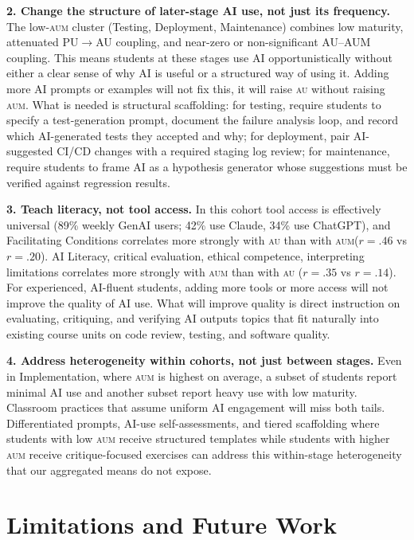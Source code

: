 \documentclass[sigconf,anonymous]{acmart}
\newcommand{\AUM}{\textsc{aum}\xspace}
\newcommand{\AU}{\textsc{au}\xspace}
\newcommand{\GenAI}{GenAI\xspace}
\begin{document}
\textbf{2. Change the structure of later-stage AI use, not just its
frequency.} The low-\AUM cluster (Testing, Deployment, Maintenance)
combines low maturity, attenuated PU$\rightarrow$AU coupling, and
near-zero or non-significant AU--AUM coupling. This means students at
these stages use AI opportunistically without either a clear sense of
why AI is useful or a structured way of using it. Adding more AI
prompts or examples will not fix this, it will raise \AU without
raising \AUM. What is needed is structural scaffolding: for testing,
require students to specify a test-generation prompt, document the
failure analysis loop, and record which AI-generated tests they
accepted and why; for deployment, pair AI-suggested CI/CD changes with
a required staging log review; for maintenance, require students to
frame AI as a hypothesis generator whose suggestions must be verified
against regression results.

\textbf{3. Teach literacy, not tool access.} In this cohort tool
access is effectively universal (89\% weekly \GenAI users; 42\% use
Claude, 34\% use ChatGPT), and Facilitating Conditions correlates more
strongly with \AU than with \AUM ($r = .46$ vs $r = .20$). AI
Literacy, critical evaluation, ethical competence, interpreting
limitations correlates more strongly with \AUM than with \AU
($r = .35$ vs $r = .14$). For experienced, AI-fluent students, adding
more tools or more access will not improve the quality of AI use. What
will improve quality is direct instruction on evaluating, critiquing,
and verifying AI outputs topics that fit naturally into existing
course units on code review, testing, and software quality.

\textbf{4. Address heterogeneity within cohorts, not just between
stages.} Even in Implementation, where \AUM is highest on average, a
subset of students report minimal AI use and another subset report
heavy use with low maturity. Classroom practices that assume uniform
AI engagement will miss both tails. Differentiated prompts, AI-use
self-assessments, and tiered scaffolding where students with low
\AUM receive structured templates while students with higher \AUM
receive critique-focused exercises can address this within-stage
heterogeneity that our aggregated means do not expose.

\section{Limitations and Future Work}
\label{sec:limitations}
\end{document}
